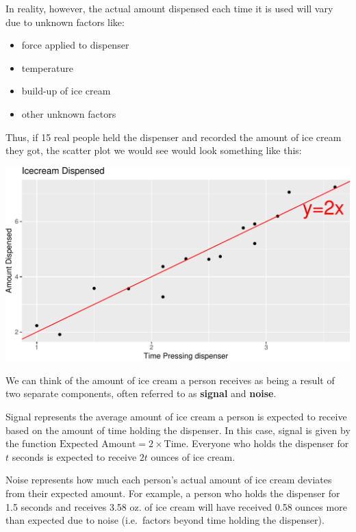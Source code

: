 \documentclass[
  letterpaper,
  DIV=11,
  numbers=noendperiod]{scrreprt}
\providecommand{\tightlist}{%
  \setlength{\itemsep}{0pt}\setlength{\parskip}{0pt}}\usepackage{longtable,booktabs,array}
\begin{document}
In reality, however, the actual amount dispensed each time it is used
will vary due to unknown factors like:

\begin{itemize}
\tightlist
\item
  force applied to dispenser\\
\item
  temperature\\
\item
  build-up of ice cream\\
\item
  other unknown factors
\end{itemize}

Thus, if 15 real people held the dispenser and recorded the amount of
ice cream they got, the scatter plot we would see would look something
like this:

\includegraphics{Ch4_files/figure-pdf/unnamed-chunk-5-1.pdf}

We can think of the amount of ice cream a person receives as being a
result of two separate components, often referred to as \textbf{signal}
and \textbf{noise}.

Signal represents the average amount of ice cream a person is expected
to receive based on the amount of time holding the dispenser. In this
case, signal is given by the function
\(\text{Expected Amount} = 2\times\text{Time}\). Everyone who holds the
dispenser for \(t\) seconds is expected to receive \(2t\) ounces of ice
cream.

Noise represents how much each person's actual amount of ice cream
deviates from their expected amount. For example, a person who holds the
dispenser for 1.5 seconds and receives 3.58 oz. of ice cream will have
received 0.58 ounces more than expected due to noise (i.e.~factors
beyond time holding the dispenser).
\end{document}
